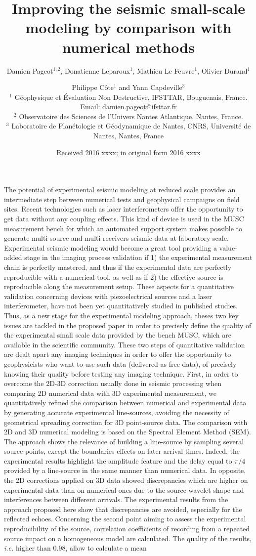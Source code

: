 \documentclass[extra,mreferee]{gji}
\title[Improving the seismic small-scale modeling by comparison with numerical methods]{Improving the seismic small-scale modeling by comparison with numerical methods}
\author[D. Pageot \textit{et al.}]
	{Damien Pageot$^{1,2}$, Donatienne Leparoux$^1$, Mathieu Le Feuvre$^1$, Olivier Durand$^1$ \and Philippe C\^ote$^1$ and Yann Capdeville$^3$ \\
	  $^1$ G\'eophysique et \'Evaluation Non Destructive, IFSTTAR, Bouguenais, France. Email: damien.pageot@ifsttar.fr \\
	  $^2$ Observatoire des Sciences de l'Univers Nantes Atlantique, Nantes, France. \\
	  $^3$ Laboratoire de Plan\'etologie et G\'eodynamique de Nantes, CNRS, Universit\'e de Nantes, Nantes, France \\
	}
\date{Received 2016 xxxx; in original form 2016 xxxx}
\begin{document}

\label{firstpage}

\maketitle

\begin{summary}
The potential of experimental seismic modeling at reduced scale provides an intermediate step between numerical tests and geophysical campaigns on field sites. Recent technologies such as laser interferometers offer the opportunity to get data without any coupling effects. This kind of device is used in the MUSC measurement bench for which an automated support system makes possible to generate multi-source and multi-receivers seismic data at laboratory scale. Experimental seismic modeling would become a great tool providing a value-added stage in the imaging process validation if 1) the experimental measurement chain is perfectly mastered, and thus if the experimental data are perfectly reproducible with a numerical tool, as well as if 2) the effective source is reproducible along the measurement setup. These aspects for a quantitative validation concerning devices with piezoelectrical sources and a laser interferometer, have not been yet quantitatively studied in published studies. Thus, as a new stage for the experimental modeling approach, theses two key issues are tackled in the proposed paper in order to precisely define the quality of the experimental small scale data provided by the bench MUSC, which are available in the scientific community. These two steps of quantitative validation are dealt apart any imaging techniques in order to offer the opportunity to geophysicists who want to use such data (delivered as free data), of precisely knowing their quality before testing any imaging technique. First, in order to overcome the 2D-3D correction usually done in seismic processing when comparing 2D numerical data with 3D experimental measurement, we quantitatively refined the comparison between numerical and experimental data by generating accurate experimental line-sources, avoiding the necessity of geometrical spreading correction for 3D point-source data. The comparison with 2D and 3D numerical modeling is based on the Spectral Element Method (SEM). The approach shows the relevance of building a line-source by sampling  several source points, except the boundaries effects on later arrival times. Indeed, the experimental results highlight the amplitude feature and the delay equal to $\pi/4$ provided by a line-source in the same manner than numerical data. In opposite, the 2D corrections applied on 3D data showed discrepancies which are higher on experimental data than on numerical ones due to the source wavelet shape and interferences between different arrivals. The experimental results from the approach proposed here show that discrepancies are avoided, especially for the reflected echoes. Concerning the second point aiming to assess the experimental reproducibility of the source, correlation coefficients of recording from a repeated source impact on a homogeneous model are calculated. The quality of the results, \textit{i.e.} higher than 0.98, allow to calculate a mean 
\end{summary}
\end{document}
